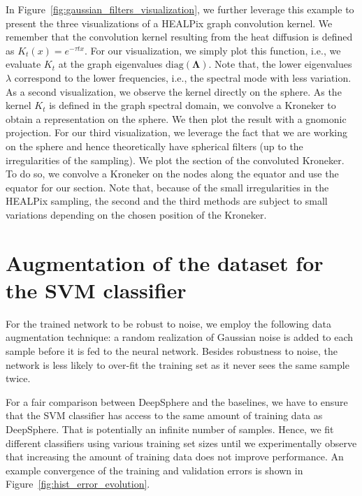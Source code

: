 \documentclass[final,twocolumn,3p,times,sort&compress]{elsarticle}
\newcommand{\figref}[1]{Figure~\ref{fig:#1}}
\renewcommand{\b}[1]{{\bm{#1}}}   %
\newcommand{\1}{\b{1}}              %
\newcommand{\0}{\b{0}}              %
\newcommand{\bLambda}{\b{\Lambda}}
\begin{document}
In \figref{gaussian_filters_visualization}, we further leverage this example to present the three visualizations of a HEALPix graph convolution kernel.
We remember that the convolution kernel resulting from the heat diffusion is defined as $K_t(x)=e^{-\tau t x}$. For our visualization, we simply plot this function, i.e., we evaluate $K_t$
at the graph eigenvalues $\text{diag}(\bLambda)$. Note that, the lower eigenvalues $\lambda$ correspond to the lower frequencies, i.e., the spectral mode with less variation.
As a second visualization, we observe the kernel directly on the sphere. As the kernel $K_t$ is defined in the graph spectral domain, we convolve a Kroneker to obtain a representation on the sphere. We then plot the result with a gnomonic projection.
For our third visualization, we leverage the fact that we are working on the sphere and hence theoretically have  spherical filters (up to the irregularities of the sampling). We plot the section of the convoluted Kroneker.
To do so, we convolve a Kroneker on the nodes along the equator and use the equator for our section.
Note that, because of the small irregularities in the HEALPix sampling, the second and the third methods are subject to small variations depending on the chosen position of the Kroneker.

\section{Augmentation of the dataset for the SVM classifier}
\label{sec:dataset_augmentation}


For the trained network to be robust to noise, we employ the following data augmentation technique: a random realization of Gaussian noise is added to each sample before it is fed to the neural network.
Besides robustness to noise, the network is less likely to over-fit the training set as it never sees the same sample twice.

For a fair comparison between DeepSphere and the baselines, we have to ensure that the SVM classifier has access to the same amount of training data as DeepSphere. That is potentially an infinite number of samples. Hence, we fit different classifiers using various training set sizes until we experimentally observe that increasing the amount of training data does not improve performance. An example convergence of the training and validation errors is shown in \figref{hist_error_evolution}.
\end{document}
